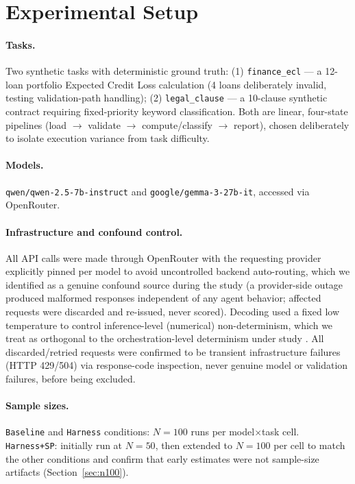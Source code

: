 \documentclass[11pt]{article}
\begin{document}
\section{Experimental Setup}
\label{sec:infra}

\paragraph{Tasks.} Two synthetic tasks with deterministic ground truth: (1) \texttt{finance\_ecl} --- a 12-loan portfolio Expected Credit Loss calculation (4 loans deliberately invalid, testing validation-path handling); (2) \texttt{legal\_clause} --- a 10-clause synthetic contract requiring fixed-priority keyword classification. Both are linear, four-state pipelines (load $\rightarrow$ validate $\rightarrow$ compute/classify $\rightarrow$ report), chosen deliberately to isolate execution variance from task difficulty.

\paragraph{Models.} \texttt{qwen/qwen-2.5-7b-instruct} and \texttt{google/gemma-3-27b-it}, accessed via OpenRouter.

\paragraph{Infrastructure and confound control.} All API calls were made through OpenRouter with the requesting provider explicitly pinned per model to avoid uncontrolled backend auto-routing, which we identified as a genuine confound source during the study (a provider-side outage produced malformed responses independent of any agent behavior; affected requests were discarded and re-issued, never scored). Decoding used a fixed low temperature to control inference-level (numerical) non-determinism, which we treat as orthogonal to the orchestration-level determinism under study \cite{thinkingmachines2025}. All discarded/retried requests were confirmed to be transient infrastructure failures (HTTP 429/504) via response-code inspection, never genuine model or validation failures, before being excluded.

\paragraph{Sample sizes.} \texttt{Baseline} and \texttt{Harness} conditions: $N=100$ runs per model$\times$task cell. \texttt{Harness+SP}: initially run at $N=50$, then extended to $N=100$ per cell to match the other conditions and confirm that early estimates were not sample-size artifacts (Section~\ref{sec:n100}).
\end{document}
